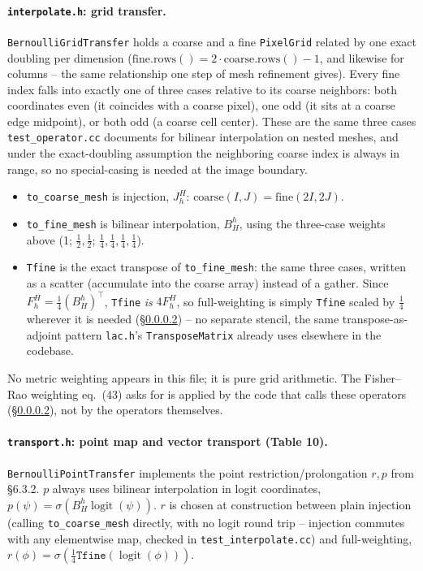 \documentclass[11pt]{article}
\begin{document}
\paragraph{\texttt{interpolate.h}: grid transfer.}
\label{sec:interpolate-design}
\texttt{BernoulliGridTransfer} holds a coarse and a fine \texttt{PixelGrid} related by one
exact doubling per dimension ($\mathrm{fine.rows()}=2\cdot\mathrm{coarse.rows()}-1$, and
likewise for columns -- the same relationship one step of mesh refinement gives). Every
fine index falls into exactly one of three cases relative to its coarse neighbors: both
coordinates even (it coincides with a coarse pixel), one odd (it sits at a coarse edge
midpoint), or both odd (a coarse cell center). These are the same three cases
\texttt{test\_operator.cc} documents for bilinear interpolation on nested meshes, and under
the exact-doubling assumption the neighboring coarse index is always in range, so no
special-casing is needed at the image boundary.
\begin{itemize}[nosep]
  \item \texttt{to\_coarse\_mesh} is injection, $J_h^H$: $\mathrm{coarse}(I,J)=\mathrm{fine}(2I,2J)$.
  \item \texttt{to\_fine\_mesh} is bilinear interpolation, $B_H^h$, using the three-case
        weights above (1; $\tfrac12,\tfrac12$; $\tfrac14,\tfrac14,\tfrac14,\tfrac14$).
  \item \texttt{Tfine} is the exact transpose of \texttt{to\_fine\_mesh}: the same three
        cases, written as a scatter (accumulate into the coarse array) instead of a gather.
        Since $F_h^H=\tfrac14(B_H^h)^\top$, \texttt{Tfine} \emph{is} $4F_h^H$, so
        full-weighting is simply \texttt{Tfine} scaled by $\tfrac14$ wherever it is needed
        (\S\ref{sec:transport-design}) -- no separate stencil, the same
        transpose-as-adjoint pattern \texttt{lac.h}'s \texttt{TransposeMatrix} already uses
        elsewhere in the codebase.
\end{itemize}
No metric weighting appears in this file; it is pure grid arithmetic. The Fisher--Rao
weighting eq.~(43) asks for is applied by the code that calls these operators
(\S\ref{sec:transport-design}), not by the operators themselves.

\paragraph{\texttt{transport.h}: point map and vector transport (Table 10).}
\label{sec:transport-design}
\texttt{BernoulliPointTransfer} implements the point restriction/prolongation $r,p$ from
\S 6.3.2. $p$ always uses bilinear interpolation in logit coordinates,
$p(\psi)=\sigma(B_H^h\operatorname{logit}(\psi))$. $r$ is chosen at construction between
plain injection (calling \texttt{to\_coarse\_mesh} directly, with no logit round trip --
injection commutes with any elementwise map, checked in \texttt{test\_interpolate.cc}) and
full-weighting, $r(\phi)=\sigma(\tfrac14\texttt{Tfine}(\operatorname{logit}(\phi)))$.
\end{document}
